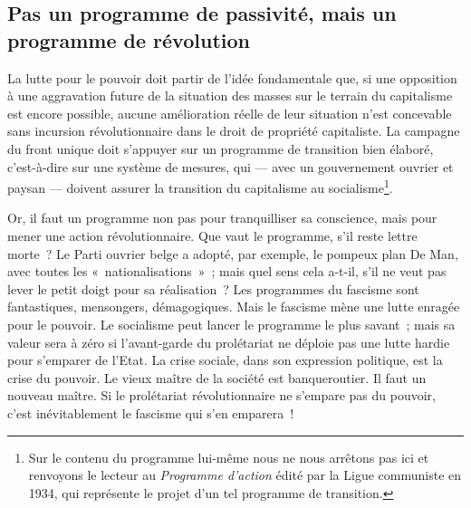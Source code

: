\documentclass[french,twoside]{book} %
\begin{document}
\subsection[{Pas un programme de passivité, mais un programme de révolution}]{Pas un programme de passivité, mais un programme de révolution}
\noindent La lutte pour le pouvoir doit partir de l’idée fondamentale que, si une opposition à une aggravation future de la situation des masses sur le terrain du capitalisme est encore possible, aucune amélioration réelle de leur situation n’est concevable sans incursion révolutionnaire dans le droit de propriété capitaliste. La campagne du front unique doit s’appuyer sur un programme de transition bien élaboré, c’est-à-dire sur une système de mesures, qui — avec un gouvernement ouvrier et paysan — doivent assurer la transition du capitalisme au socialisme\footnote{ \noindent Sur le contenu du programme lui-même nous ne nous arrêtons pas ici et renvoyons le lecteur au \emph{Programme d’action} édité par la Ligue communiste en 1934, qui représente le projet d’un tel programme de transition.
 }.\par
Or, il faut un programme non pas pour tranquilliser sa conscience, mais pour mener une action révolutionnaire. Que vaut le programme, s’il reste lettre morte ? Le Parti ouvrier belge a adopté, par exemple, le pompeux plan De Man, avec toutes les « nationalisations » ; mais quel  sens cela a-t-il, s’il ne veut pas lever le petit doigt pour sa réalisation ? Les programmes du fascisme sont fantastiques, mensongers, démagogiques. Mais le fascisme mène une lutte enragée pour le pouvoir. Le socialisme peut lancer le programme le plus savant ; mais sa valeur sera à zéro si l’avant-garde du prolétariat ne déploie pas une lutte hardie pour s’emparer de l’Etat. La crise sociale, dans son expression politique, est la crise du pouvoir. Le vieux maître de la société est banqueroutier. Il faut un nouveau maître. Si le prolétariat révolutionnaire ne s’empare pas du pouvoir, c’est inévitablement le fascisme qui s’en emparera !\par
\end{document}
